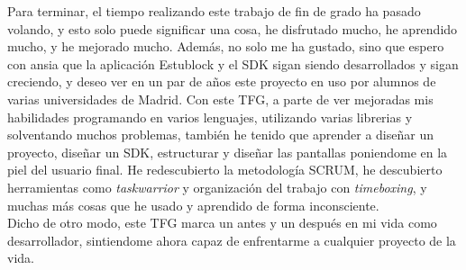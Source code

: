 Para terminar, el tiempo realizando este trabajo de fin de grado ha pasado volando, y esto solo puede significar una cosa, he disfrutado mucho, he aprendido mucho, y he mejorado mucho. Además, no solo me ha gustado, sino que espero con ansia que la aplicación Estublock y el SDK sigan siendo desarrollados y sigan creciendo, y deseo ver en un par de años este proyecto en uso por alumnos de varias universidades de Madrid. Con este TFG, a parte de ver mejoradas mis habilidades programando en varios lenguajes, utilizando varias librerias y solventando muchos problemas, también he tenido que aprender a diseñar un proyecto, diseñar un SDK, estructurar y diseñar las pantallas poniendome en la piel del usuario final. He redescubierto la metodología SCRUM, he descubierto herramientas como \textit{taskwarrior} y organización del trabajo con \textit{timeboxing}, y muchas más cosas que he usado y aprendido de forma inconsciente. \\

Dicho de otro modo, este TFG marca un antes y un después en mi vida como desarrollador, sintiendome ahora capaz de enfrentarme a cualquier proyecto de la vida. 
